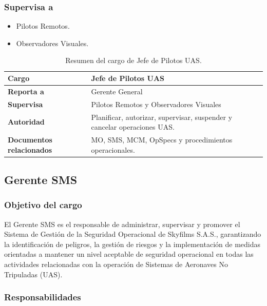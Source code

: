 \subsubsection*{Supervisa a}

\begin{itemize}

\item Pilotos Remotos.

\item Observadores Visuales.

\end{itemize}

\begin{table}[H]
\centering
\renewcommand{\arraystretch}{1.3}
\begin{tabularx}{\textwidth}{|p{4cm}|X|}
\hline
\textbf{Cargo} & Jefe de Pilotos UAS \\ \hline
\textbf{Reporta a} & Gerente General \\ \hline
\textbf{Supervisa} & Pilotos Remotos y Observadores Visuales \\ \hline
\textbf{Autoridad} & Planificar, autorizar, supervisar, suspender y cancelar operaciones UAS. \\ \hline
\textbf{Documentos relacionados} & MO, SMS, MCM, OpSpecs y procedimientos operacionales. \\ \hline
\end{tabularx}
\caption{Resumen del cargo de Jefe de Pilotos UAS.}
\end{table}


\subsection{Gerente SMS}

\subsubsection*{Objetivo del cargo}

El Gerente SMS es el responsable de administrar, supervisar y promover el Sistema de Gestión de la Seguridad Operacional de Skyfilms S.A.S., garantizando la identificación de peligros, la gestión de riesgos y la implementación de medidas orientadas a mantener un nivel aceptable de seguridad operacional en todas las actividades relacionadas con la operación de Sistemas de Aeronaves No Tripuladas (UAS).

\subsubsection*{Responsabilidades}

